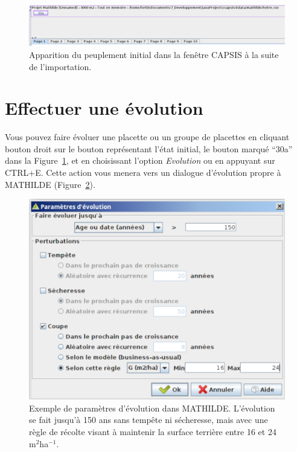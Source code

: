 \documentclass[a4paper,12pt]{article}
\begin{document}
\begin{figure}[!h]
\begin{center}
\includegraphics[width=\textwidth]{./figures/initializationExample3}
\caption{Apparition du peuplement initial dans la fen\^etre CAPSIS à la suite de l'importation.}
\label{figureInitEx3}
\end{center}
\end{figure}

\section{Effectuer une évolution}

Vous pouvez faire évoluer une placette ou un groupe de placettes en cliquant bouton droit sur le bouton représentant l'état initial, le bouton marqué ``30a'' dans la Figure~\ref{figureInitEx3}, et en choisissant l'option \textit{Evolution} ou en appuyant sur CTRL+E. Cette action vous menera vers un dialogue d'évolution propre à MATHILDE (Figure~\ref{figureEvolEx1}).

\begin{figure}[!h]
\begin{center}
\includegraphics[width=\textwidth]{./figures/evolutionExample1}
\caption{Exemple de paramètres d'évolution dans MATHILDE. L'évolution se fait jusqu'à 150 ans sans temp\^ete ni sécheresse, mais avec une règle de récolte visant à maintenir la surface terrière entre 16 et 24 m$^2$ha$^{-1}$.}
\label{figureEvolEx1}
\end{center}
\end{figure}
\end{document}
